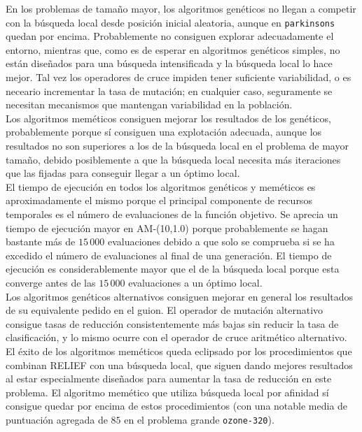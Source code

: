 \documentclass{article}
\begin{document}

En los problemas de tamaño mayor, los algoritmos genéticos no llegan a competir con la búsqueda local desde posición inicial aleatoria, aunque en \texttt{parkinsons} quedan por encima. Probablemente no consiguen explorar adecuadamente el entorno, mientras que, como es de esperar en algoritmos genéticos simples, no están diseñados para una búsqueda intensificada y la búsqueda local lo hace mejor. Tal vez los operadores de cruce impiden tener suficiente variabilidad, o es neceario incrementar la tasa de mutación; en cualquier caso, seguramente se necesitan mecanismos que mantengan variabilidad en la población. \\

Los algoritmos meméticos consiguen mejorar los resultados de los genéticos, probablemente porque sí consiguen una explotación adecuada, aunque los resultados no son superiores a los de la búsqueda local en el problema de mayor tamaño, debido posiblemente a que la búsqueda local necesita más iteraciones que las fijadas para conseguir llegar a un óptimo local. \\

El tiempo de ejecución en todos los algoritmos genéticos y meméticos es aproximadamente el mismo porque el principal componente de recursos temporales es el número de evaluaciones de la función objetivo. Se aprecia un tiempo de ejecución mayor en AM-(10,1.0) porque probablemente se hagan bastante más de $15\,000$ evaluaciones debido a que solo se comprueba si se ha excedido el número de evaluaciones al final de una generación. El tiempo de ejecución es considerablemente mayor que el de la búsqueda local porque esta converge antes de las $15\,000$ evaluaciones a un óptimo local. \\

Los algoritmos genéticos alternativos consiguen mejorar en general los resultados de su equivalente pedido en el guion. El operador de mutación alternativo consigue tasas de reducción consistentemente más bajas sin reducir la tasa de clasificación, y lo mismo ocurre con el operador de cruce aritmético alternativo. \\

El éxito de los algoritmos meméticos queda eclipsado por los procedimientos que combinan RELIEF con una búsqueda local, que siguen dando mejores resultados al estar especialmente diseñados para aumentar la tasa de reducción en este problema. El algoritmo memético que utiliza búsqueda local por afinidad sí consigue quedar por encima de estos procedimientos (con una notable media de puntuación agregada de $85$ en el problema grande \texttt{ozone-320}).
\end{document}
